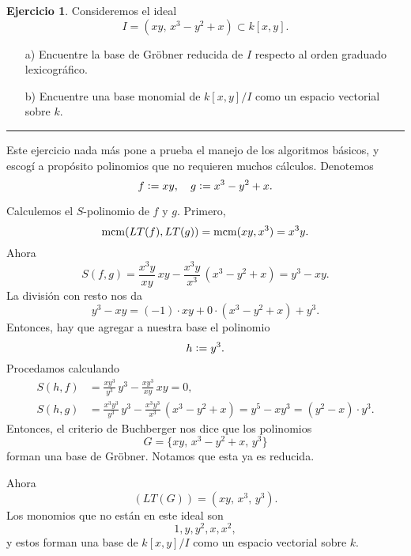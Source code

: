 \documentclass{article}
\theoremstyle{definition}
\newtheorem{ejerc}{Ejercicio}
\begin{document}
\pagestyle{empty}


\begin{ejerc}
  Consideremos el ideal
  $$I = (xy, \, x^3-y^2+x) \subset k [x,y].$$

  \begin{enumerate}
  \item[a)] Encuentre la base de Gröbner reducida de $I$ respecto al orden
    graduado lexicográfico.

  \item[b)] Encuentre una base monomial de $k[x,y]/I$ como un espacio vectorial
    sobre $k$.
  \end{enumerate}
\end{ejerc}

\ifdefined\solutions

\hrule
\vspace{1em}

Este ejercicio nada más pone a prueba el manejo de los algoritmos básicos, y
escogí a propósito polinomios que no requieren muchos cálculos. Denotemos
$$f \mathrel{\mathop:}= xy, \quad g \mathrel{\mathop:}= x^3 - y^2 + x.$$

Calculemos el $S$-polinomio de $f$ y $g$. Primero,
$$\operatorname{mcm} (LT (f), LT (g)) = \operatorname{mcm} (xy, x^3) = x^3 y.$$
Ahora
\[ S (f,g) =
   \frac{x^3y}{xy}\,xy - \frac{x^3y}{x^3}\,(x^3 - y^2 + x) =
   y^3 - xy. \]
La división con resto nos da
$$y^3 - xy = (-1)\cdot xy + 0\cdot (x^3 - y^2 + x) + y^3.$$
Entonces, hay que agregar a nuestra base el polinomio
$$h \mathrel{\mathop:}= y^3.$$
Procedamos calculando
\begin{align*}
  S (h, f) & = \frac{xy^3}{y^3}\,y^3 - \frac{xy^3}{xy}\,xy = 0,\\
  S (h, g) & = \frac{x^3y^3}{y^3}\,y^3 - \frac{x^3 y^3}{x^3}\,(x^3 - y^2 + x) = y^5 - xy^3 = (y^2 - x)\cdot y^3.
\end{align*}
Entonces, el criterio de Buchberger nos dice que los polinomios
$$G = \{ xy, \, x^3-y^2+x, \, y^3 \}$$
forman una base de Gröbner. Notamos que esta ya es reducida.

\pagebreak

Ahora
$$(LT (G)) = (xy, \, x^3, \, y^3).$$
Los monomios que no están en este ideal son
$$1, y, y^2, x, x^2,$$
y estos forman una base de $k[x,y]/I$ como un espacio vectorial sobre $k$.

\begin{center}
\end{center}
\end{document}
